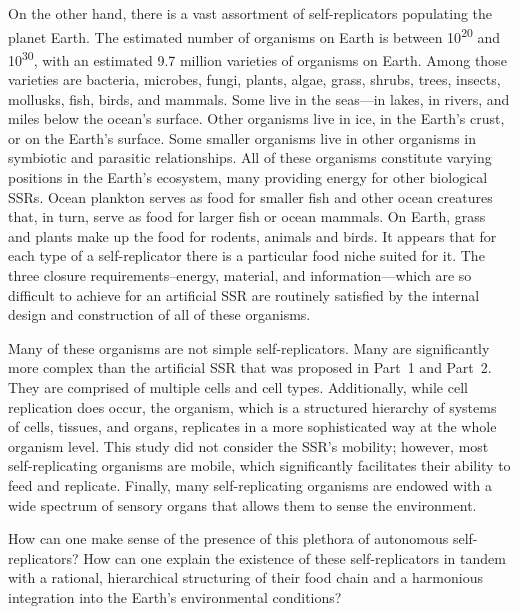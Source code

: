 On the other hand, there is a vast assortment of
self-replicators populating the planet Earth. The estimated number of
organisms on Earth is between 10\textsuperscript{20} and
10\textsuperscript{30}, with an estimated 9.7 million varieties of
organisms on Earth. Among those varieties are bacteria, microbes,
fungi, plants, algae, grass, shrubs, trees, insects, mollusks, fish,
birds, and mammals. Some live in the seas---in 
lakes,  in rivers, and miles below the ocean's surface. Other
organisms live in ice, in the Earth’s crust, or on the Earth’s surface.
Some smaller organisms live in other organisms in symbiotic and parasitic relationships. 
All of these organisms constitute varying positions in the Earth's ecosystem, 
many providing energy for other biological SSRs.
Ocean
plankton serves as food for smaller fish and other ocean creatures that, in
turn, serve as food for larger fish or ocean mammals. On Earth, grass
and plants make up the food for rodents, animals and birds. It appears
that for each type of a self-replicator there is a particular food
niche suited for it. 
The three closure requirements--energy, material, and information---which 
are so difficult to achieve for an artificial SSR are routinely satisfied 
by the internal design and construction of all of these organisms.

Many of these organisms are not simple self-replicators. Many are significantly more complex than the artificial SSR  that was proposed in Part~1 and Part~2. They are comprised of multiple cells and cell types. Additionally, while cell replication does occur, the organism, which is a structured hierarchy of systems of cells, tissues, and organs, replicates in a more sophisticated way at the whole organism level. This study did not consider the SSR’s mobility; however, most self-replicating organisms are mobile, which significantly facilitates their ability to feed and replicate. Finally, many self-replicating organisms are endowed with a wide spectrum of sensory organs that allows them to sense the environment.

How can one make sense of the presence of this plethora of
autonomous self-replicators? How can one explain the
existence of these self-replicators in tandem with a rational, hierarchical
structuring of their food chain and a harmonious integration into the
Earth’s environmental conditions?

